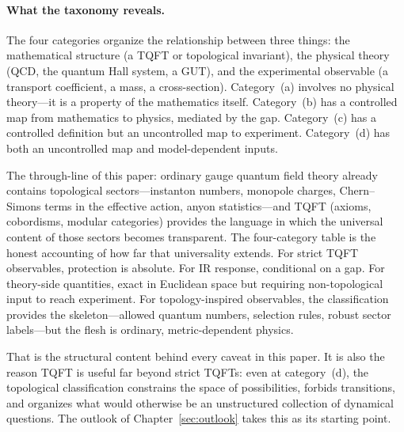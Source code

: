 \paragraph{What the taxonomy reveals.}
The four categories organize the relationship between three things: the mathematical structure (a TQFT or topological invariant), the physical theory (QCD, the quantum Hall system, a GUT), and the experimental observable (a transport coefficient, a mass, a cross-section). Category~(a) involves no physical theory---it is a property of the mathematics itself. Category~(b) has a controlled map from mathematics to physics, mediated by the gap. Category~(c) has a controlled definition but an uncontrolled map to experiment. Category~(d) has both an uncontrolled map and model-dependent inputs.

The through-line of this paper: ordinary gauge quantum field theory already contains topological sectors---instanton numbers, monopole charges, Chern--Simons terms in the effective action, anyon statistics---and TQFT (axioms, cobordisms, modular categories) provides the language in which the universal content of those sectors becomes transparent. The four-category table is the honest accounting of how far that universality extends. For strict TQFT observables, protection is absolute. For IR response, conditional on a gap. For theory-side quantities, exact in Euclidean space but requiring non-topological input to reach experiment. For topology-inspired observables, the classification provides the skeleton---allowed quantum numbers, selection rules, robust sector labels---but the flesh is ordinary, metric-dependent physics.

That is the structural content behind every caveat in this paper. It is also the reason TQFT is useful far beyond strict TQFTs: even at category~(d), the topological classification constrains the space of possibilities, forbids transitions, and organizes what would otherwise be an unstructured collection of dynamical questions. The outlook of Chapter~\ref{sec:outlook} takes this as its starting point.
